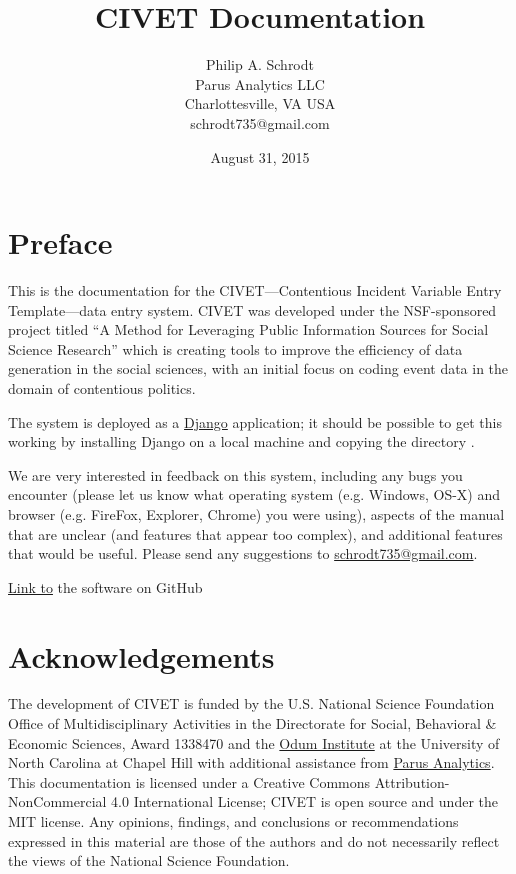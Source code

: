 \documentclass[letterpaper,10pt,english]{sphinxmanual}
\title{CIVET Documentation}
\date{August 31, 2015}
\author{Philip A. Schrodt\\Parus Analytics LLC\\Charlottesville, VA USA\\schrodt735@gmail.com}
\begin{document}
\maketitle
\tableofcontents
{}\label{index::doc}\section*{Preface}
This is the documentation for the CIVET—Contentious Incident Variable Entry Template—data entry system.
CIVET was developed under the NSF-sponsored project titled “A Method for Leveraging Public Information
Sources for Social Science Research” which is creating tools to improve the efficiency of data generation
in the social sciences, with an initial focus on coding event data in the domain of contentious politics.

The system is deployed as a \href{https://www.djangoproject.com/start/overview/}{Django} application;
it should be possible to get this working by installing Django on a local machine and copying the directory .

We are very interested in feedback on this system, including any bugs
you encounter (please let us know what operating system (e.g. Windows,
OS-X) and browser (e.g. FireFox, Explorer, Chrome) you were using),
aspects of the manual that are unclear (and features that appear too
complex), and additional features that would be useful. Please send any
suggestions to \href{mailto:schrodt735@gmail.com}{schrodt735@gmail.com}.

\href{https://github.com/civet-software}{Link to} the software on GitHub
\section*{Acknowledgements}
The development of CIVET is funded by the U.S. National Science Foundation Office of Multidisciplinary Activities
in the Directorate for Social, Behavioral \& Economic Sciences, Award 1338470 and the \href{http://www.odum.unc.edu/odum/home2.jsp}{Odum Institute} at the University of North Carolina at Chapel Hill with additional assistance from \href{http://parusanalytics.com/}{Parus Analytics}. This documentation is licensed under a Creative Commons Attribution-NonCommercial 4.0 International License; CIVET is open source and under the MIT license.
Any opinions, findings, and conclusions or recommendations expressed in this material are those of the authors
and do not necessarily reflect the views of the National Science Foundation.
\end{document}
